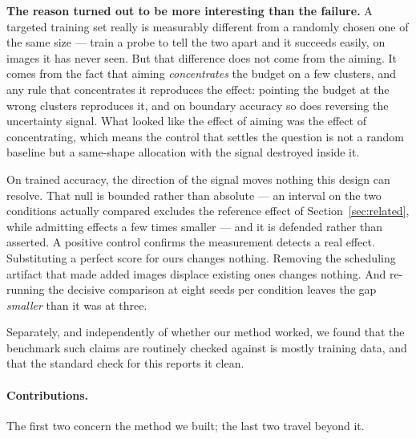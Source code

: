 \documentclass{article}
\begin{document}
\textbf{The reason turned out to be more interesting than the failure.} A targeted training set
really is measurably different from a randomly chosen one of the same size --- train a probe to tell
the two apart and it succeeds easily, on images it has never seen. But that difference does not come
from the aiming. It comes from the fact that aiming \emph{concentrates} the budget on a few
clusters, and any rule that concentrates it reproduces the effect: pointing the budget at the wrong
clusters reproduces it, and on boundary accuracy so does reversing the uncertainty signal. What
looked like the effect of aiming was the effect of concentrating, which means the control that
settles the question is not a random baseline but a same-shape allocation with the signal destroyed
inside it.

On trained accuracy, the direction of the signal moves nothing this design can resolve. That null is
bounded rather than absolute --- an interval on the two conditions actually compared excludes the
reference effect of Section~\ref{sec:related}, while admitting effects a few times smaller --- and it is
defended rather than asserted. A positive control confirms the measurement detects a real effect.
Substituting a perfect score for ours changes nothing. Removing the scheduling artifact that made
added images displace existing ones changes nothing. And re-running the decisive comparison at eight
seeds per condition leaves the gap \emph{smaller} than it was at three.

Separately, and independently of whether our method worked, we found that the benchmark such claims
are routinely checked against is mostly training data, and that the standard check for this reports
it clean.

\paragraph{Contributions.} The first two concern the method we built; the last two travel beyond it.
\end{document}
